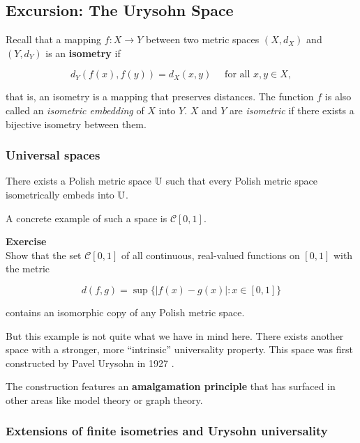 \subsection{Excursion: The Urysohn Space}

Recall that a mapping $f: X \to Y$ between two metric spaces $(X,d_X)$ and $(Y,d_Y)$ is an \textbf{isometry} if

\begin{equation}
d_Y(f(x),f(y)) = d_X(x,y) \quad \text{ for all $x,y \in X$},
\end{equation}

that is, an isometry is a mapping that preserves distances. The function $f$ is also called an \textit{isometric embedding} of $X$ into $Y$. $X$ and $Y$ are \textit{isometric} if there exists a bijective isometry between them.

\subsubsection{Universal spaces}

\begin{theorem}There exists a Polish metric space $\mathbb{U}$ such that every Polish metric space isometrically embeds into $\mathbb{U}$.

\end{theorem}A concrete example of such a space is $\mathcal{C}[0,1]$.

\begin{framed}
\textbf{Exercise}\\
Show that the set $\mathcal{C}[0,1]$ of all continuous, real-valued functions on $[0,1]$ with the metric

\begin{equation}
d(f,g) = \sup\{|f(x) - g(x)| \colon x \in [0,1] \}
\end{equation}

contains an isomorphic copy of any Polish metric space.
\end{framed}

But this example is not quite what we have in mind here. There exists another space with a stronger, more ``intrinsic'' universality property. This space was first constructed by Pavel Urysohn in 1927 \cite{Urysohn:1927a}.

The construction features an \textbf{amalgamation principle} that has surfaced in other areas like model theory or graph theory.

\subsubsection{Extensions of finite isometries and Urysohn universality}

